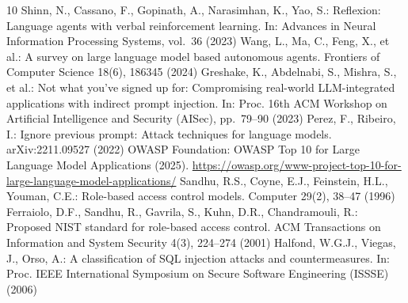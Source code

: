 \documentclass[runningheads]{llncs}
\begin{document}
\begin{thebibliography}{10}
 Shinn, N., Cassano, F., Gopinath, A., Narasimhan, K., Yao, S.: Reflexion: Language agents with verbal reinforcement learning. In: Advances in Neural Information Processing Systems, vol.~36 (2023)
 Wang, L., Ma, C., Feng, X., et al.: A survey on large language model based autonomous agents. Frontiers of Computer Science 18(6), 186345 (2024)
 Greshake, K., Abdelnabi, S., Mishra, S., et al.: Not what you've signed up for: Compromising real-world LLM-integrated applications with indirect prompt injection. In: Proc. 16th ACM Workshop on Artificial Intelligence and Security (AISec), pp.~79--90 (2023)
 Perez, F., Ribeiro, I.: Ignore previous prompt: Attack techniques for language models. arXiv:2211.09527 (2022)
 OWASP Foundation: OWASP Top 10 for Large Language Model Applications (2025). \url{https://owasp.org/www-project-top-10-for-large-language-model-applications/}
 Sandhu, R.S., Coyne, E.J., Feinstein, H.L., Youman, C.E.: Role-based access control models. Computer 29(2), 38--47 (1996)
 Ferraiolo, D.F., Sandhu, R., Gavrila, S., Kuhn, D.R., Chandramouli, R.: Proposed NIST standard for role-based access control. ACM Transactions on Information and System Security 4(3), 224--274 (2001)
 Halfond, W.G.J., Viegas, J., Orso, A.: A classification of SQL injection attacks and countermeasures. In: Proc. IEEE International Symposium on Secure Software Engineering (ISSSE) (2006)
\end{thebibliography}
\end{document}
